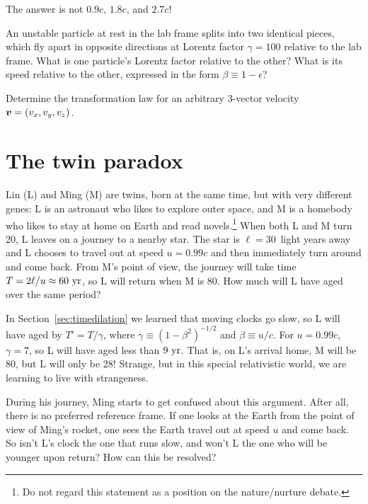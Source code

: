 The answer is not $0.9c$, $1.8c$, and $2.7c$!

\begin{problem}
An unstable particle at rest in the lab frame splits into two
identical pieces, which fly apart in opposite directions at Lorentz
factor $\gamma=100$ relative to the lab frame.  What is one particle's
Lorentz factor relative to the other?  What is its speed relative to
the other, expressed in the form $\beta\equiv 1-\epsilon$?
\end{problem}

\begin{problem}
Determine the transformation law for an arbitrary 3-vector velocity
$\mbox{\boldmath $v$}=(v_x,v_y,v_z)$.
\end{problem}


\section{The twin paradox}
\label{sec:twins}

Lin (L) and Ming (M) are twins, born at the same time, but with very
different genes: L is an astronaut who likes to explore outer space,
and M is a homebody who likes to stay at home on Earth and read
novels.\footnote{Do not regard this statement as a position on the
nature/nurture debate.}  When both L and M turn 20, L leaves on a
journey to a nearby star.  The star is $\ell=30$~light years away and
L chooses to travel out at speed $u=0.99 c$ and then immediately turn
around and come back.  From M's point of view, the journey will take
time $T=2\ell /u\approx 60~{\rm yr}$, so L will return when M is 80.
How much will L have aged over the same period?

In Section~\ref{sec:timedilation} we learned that moving clocks go
slow, so L will have aged by $T'=T/\gamma$, where $\gamma\equiv
(1-\beta^2)^{-1/2}$ and $\beta\equiv u/c$.  For $u=0.99 c$,
$\gamma=7$, so L will have aged less than $9~{\rm yr}$.  That is, on
L's arrival home, M will be 80, but L will only be 28!  Strange, but
in this special relativistic world, we are learning to live with
strangeness.

During his journey, Ming starts to get confused about this argument.
After all, there is no preferred reference frame.  If one looks at the
Earth from the point of view of Ming's rocket, one sees the Earth
travel out at speed $u$ and come back.  So isn't L's clock the one
that runs slow, and won't L the one who will be younger upon return?
How can this be resolved?

